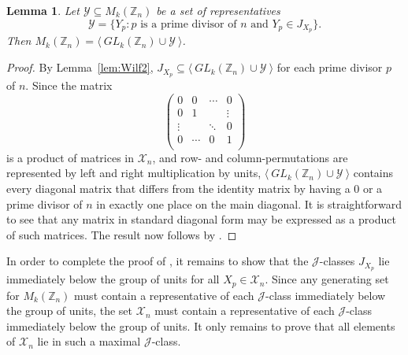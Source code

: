 \documentclass[11pt]{article}
\newtheorem{lemma}[thm]{Lemma}
\numberwithin{equation}{section}
\newcommand{\set}[2]{\ensuremath{\{#1 : #2 \}}}
\newcommand{\genset}[1]{\ensuremath{\langle\: #1 \:\rangle}}
\newcommand{\J}{\mathscr{J}}
\newcommand{\Z}{\mathbb{Z}}
\begin{document}
\begin{lemma}
  Let $\mathcal{Y} \subseteq M_k(\Z_n)$ be a set of representatives
  \[\mathcal{Y} = \set{Y_p}{p \text{ is a prime divisor of } n \text{ and } Y_p
      \in J_{X_p}}.\]
  Then $M_k(\Z_n) = \genset{GL_k(\Z_n) \cup \mathcal{Y}}$.
\end{lemma}

\begin{proof}
  By Lemma~\ref{lem:Wilf2}, $J_{X_p} \subseteq \genset{GL_k(\Z_n) \cup
    \mathcal{Y}}$ for each prime divisor $p$ of $n$.
  Since the matrix
  \[
  \begin{pmatrix}
      0       & 0      & \cdots & 0      \\
      0       & 1      &        & \vdots \\
      \vdots  &        & \ddots & 0      \\
      0       & \cdots & 0      & 1      \\
  \end{pmatrix}
\]
  is a product of matrices in $\mathcal{X}_n$, and row- and column-permutations
  are represented by left and right multiplication by units, $\genset{GL_k(\Z_n)
    \cup \mathcal{Y}}$ contains every diagonal matrix that differs from
  the identity matrix by having a $0$ or a prime divisor of $n$ in exactly one
  place on the main diagonal. It is straightforward to see that any matrix in
  standard diagonal form may be expressed as a product of such matrices. The
  result now follows by .
\end{proof}

In order to complete the proof of , it remains to show that
the $\J$-classes $J_{X_p}$ lie immediately below the group of units for all $X_p
\in \mathcal{X}_n$. Since any generating set for $M_k(\Z_n)$ must contain a
representative of each $\J$-class immediately below the group of units, the set
$\mathcal{X}_n$ must contain a representative of each $\J$-class immediately
below the group of units. It only remains to prove that all elements of
$\mathcal{X}_n$ lie in such a maximal $\J$-class.
\end{document}
